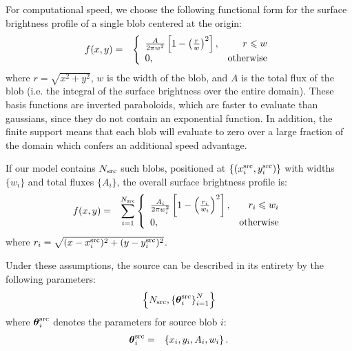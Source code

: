 \documentclass[useAMS,usenatbib]{mn2e}
\begin{document}
For computational speed, we choose the following
functional form for the surface brightness profile
of a single blob centered at the origin:
\begin{eqnarray}
f(x, y) &=& \left\{
\begin{array}{lr}
\frac{A}{2\pi w^2}\left[1 - \left(\frac{r}{w}\right)^2\right], & r \leq w\\
0, & \textnormal{otherwise}
\end{array}
\right.
\end{eqnarray}
where $r = \sqrt{x^2 + y^2}$, $w$ is the width of the blob, and $A$ is the
total flux of the blob (i.e. the integral of the surface brightness over the
entire domain).
These basis functions are inverted paraboloids, which are faster to evaluate
than gaussians, since they do not
contain an exponential function. In addition, the finite support means that
each blob will evaluate to zero over a large fraction of the domain which
confers an additional speed advantage.

If our model contains $N_{\rm src}$ such blobs, positioned at
$\left\{(x_i^{\rm src}, y_i^{\rm src})\right\}$ with widths $\{w_i\}$ and total fluxes
$\{A_i\}$, the overall surface brightness profile is:
\begin{eqnarray}
f(x, y) &=& \sum_{i=1}^{N_{\rm src}}\left\{
\begin{array}{lr}
\frac{A_i}{2\pi w_i^2}\left[1 - \left(\frac{r_i}{w_i}\right)^2\right], & r_i \leq w_i\\
0, & \textnormal{otherwise}
\end{array}
\right.
\end{eqnarray}
where $r_i = \sqrt{(x - x_i^{\rm src})^2 + (y - y_i^{\rm src})^2}$.

Under these assumptions, the source can be described in its entirety
by the following parameters:
\begin{eqnarray}
\left\{
N_{\rm src}, \left\{\boldsymbol{\theta}^{\rm src}_i\right\}_{i=1}^N
\right\}
\end{eqnarray}
where $\boldsymbol{\theta}^{\rm src}_i$ denotes the parameters for source blob $i$:
\begin{eqnarray}
\boldsymbol{\theta}^{\rm src}_i &=& \left\{x_i, y_i, A_i, w_i
\right\}.
\end{eqnarray}
\end{document}
